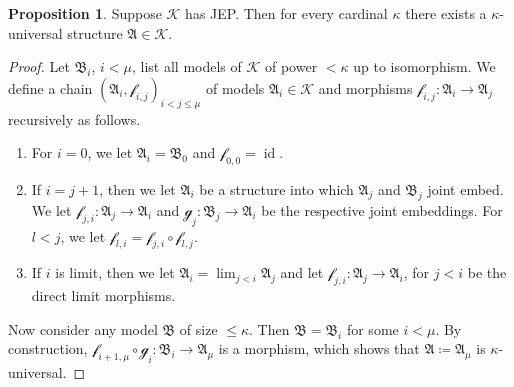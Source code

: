 \documentclass[a4paper]{amsart}
\theoremstyle{definition}
\newtheorem{proposition}[definition]{Proposition}
\theoremstyle{remark}
\newcommand{\A}{\mathcal{A}}
\newcommand{\B}{\mathcal{B}}
\newcommand{\K}{\mathcal{K}}
\theoremstyle{definition}
\renewcommand{\A}{\mathfrak{A}}
\renewcommand{\B}{\mathfrak{B}}
\DeclareMathOperator{\id}{id}
\newcommand{\f}{\mathcal{f}}
\newcommand{\g}{\mathcal{g}}
\begin{document}
\begin{proposition}\label{kappa.universality}
	Suppose $\K$ has JEP. Then for every cardinal $\kappa$ there exists a $\kappa$-universal structure $\A\in \K$.
\end{proposition}
\begin{proof}
    Let $\B_i$, $i<\mu$, list all models of $\K$ of power $<\kappa$ up to isomorphism. We define a chain $(\A_i, \f_{i,j})_{i<j\leq\mu}$ of models $\A_i\in\K$ and morphisms $\f_{i,j}\colon\A_i\to\A_{j}$ recursively as follows.
	\begin{enumerate}
		\item For $i=0$, we let $\A_i=\B_0$ and $\f_{0,0} = \id$.
		
		\item If $i=j+1$, then we let $\A_i$ be a structure into which $\A_j$ and $\B_j$ joint embed. We let $\f_{j,i}\colon\A_j\to\A_i$ and $\g_j\colon\B_j\to\A_i$ be the respective joint embeddings. For $l<j$, we let $\f_{l,i} = \f_{j,i}\circ\f_{l,j}$.
		
		\item If $i$ is limit, then we let $\A_i = \lim_{j<i}\A_j$ and let $\f_{j,i}\colon\A_j\to\A_i$, for $j<i$ be the direct limit morphisms.
	\end{enumerate}	
	Now consider any model $\B$ of size $\leq\kappa$. Then $\B = \B_i$ for some $i<\mu$. By construction, $\f_{i+1,\mu}\circ\g_i\colon\B_i\to\A_\mu$ is a morphism, which shows that $\A \coloneqq \A_\mu$ is $\kappa$-universal.
\end{proof}
\end{document}
